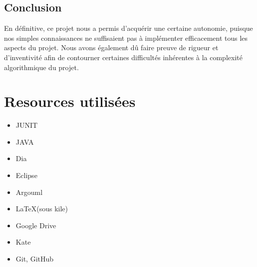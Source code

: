 ﻿\documentclass[a4paper,twoside,12pt]{report}
\begin{document}
\section{Conclusion}
%
En définitive, ce projet nous a permis d'acquérir une certaine autonomie, puisque nos simples connaissances ne suffisaient pas à implémenter efficacement tous les aspects du projet.
Nous avons également dû faire preuve de rigueur et d'inventivité afin de contourner certaines difficultés inhérentes à la complexité algorithmique du projet.
\chapter{Resources utilisées}
\begin{itemize}
 \item JUNIT
 \item JAVA
 \item Dia
 \item Eclipse
 \item Argouml
 \item \LaTeX (sous kile)
 \item Google Drive
 \item Kate
 \item Git, GitHub
\end{itemize}
\end{document}

